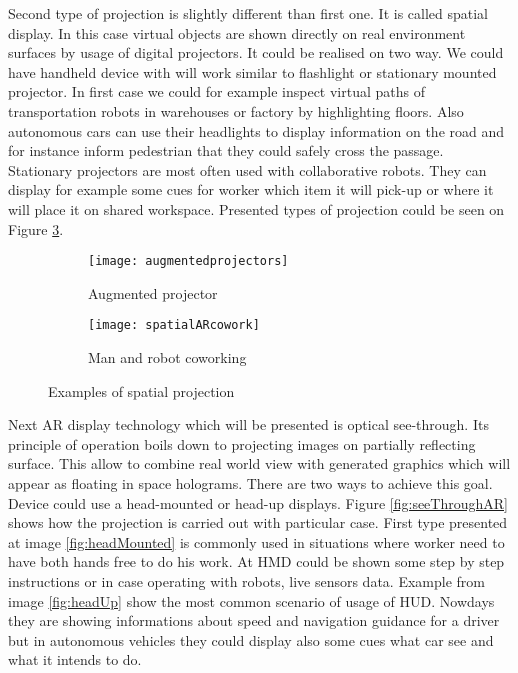 \documentclass[printmode,en]{mgr}
\begin{document}
Second type of projection is slightly different than first one. It is called spatial display. In this case virtual objects are shown directly on real environment surfaces by usage of digital projectors. It could be realised on two way. We could have handheld device with will work similar to flashlight or stationary mounted projector. In first case we could for example inspect virtual paths of transportation robots in warehouses or factory by highlighting floors. Also autonomous cars can use their headlights to display information on the road and for instance inform pedestrian that they could safely cross the passage. Stationary projectors are most often used with collaborative robots. They can display for example some cues for worker which item it will pick-up or where it will place it on shared workspace. Presented types of projection could be seen on Figure \ref{fig:spatialAR}.

\begin{figure}[!ht]
\centering
\begin{subfigure}{.4\textwidth}
  \centering
  \texttt{[image: augmentedprojectors]}
  \caption{Augmented projector \cite{augmentedprojectors}}
  \label{fig:augmentedprojectors}
\end{subfigure}%
\begin{subfigure}{.4\textwidth}
  \centering
  \texttt{[image: spatialARcowork]}
  \caption{Man and robot coworking \cite{SpatialARCollaborative}}
  \label{fig:spatialARcowork}
\end{subfigure}
\caption{Examples of spatial projection}
\label{fig:spatialAR}
\end{figure}

Next AR display technology which will be presented is optical see-through. Its principle of operation boils down to projecting images on partially reflecting surface. This allow to combine real world view with generated graphics which will appear as floating in space holograms. There are two ways to achieve this goal. Device could use a head-mounted or head-up displays. Figure \ref{fig:seeThroughAR} shows how the projection is carried out with particular case. First type presented at image \ref{fig:headMounted} is commonly used in situations where worker need to have both hands free to do his work. At HMD could be shown some step by step instructions or in case operating with robots, live sensors data. Example from image \ref{fig:headUp} show the most common scenario of usage of HUD. Nowdays they are showing informations about speed and navigation guidance for a driver but in autonomous vehicles they could display also some cues what car see and what it intends to do.
\end{document}
